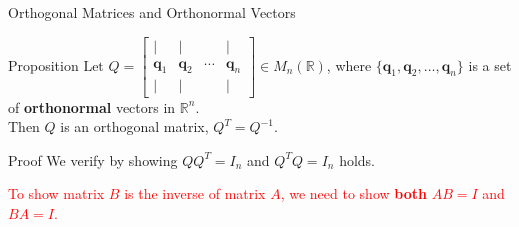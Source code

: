 \documentclass[aspectratio=169, UTF8]{ctexbeamer}
\begin{document}
\begin{frame}{Orthogonal Matrices and Orthonormal Vectors}
    \begin{block}{Proposition}
        $\text{Let } Q = \begin{bmatrix} | & | & & | \\ \mathbf{q}_1 & \mathbf{q}_2 & \cdots & \mathbf{q}_n \\ | & | & & | \end{bmatrix} \in M_n(\mathbb{R})$,
        where $\{\mathbf{q}_1, \mathbf{q}_2, \dots, \mathbf{q}_n \}$ is a set of \textbf{orthonormal} vectors in $\mathbb{R}^n.$\\

        Then $Q$ is an orthogonal matrix, $Q^T = Q^{-1}$.\\
    \end{block}
    \begin{block}{Proof}
        We verify by showing $QQ^T = I_n$ and $Q^T Q = I_n$ holds.
    \end{block}
    \textcolor{red}{To show matrix $B$ is the inverse of matrix $A$, we need to show \textbf{both} $AB = I$ and $BA = I$.}
\end{frame}
\end{document}
